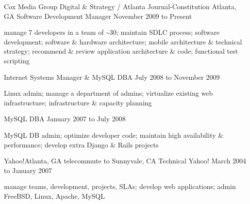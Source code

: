\documentclass[10pt]{article}
\begin{document}




\sectionheader
{Cox Media Group Digital \& Strategy / Atlanta Journal-Constitution}
{Atlanta, GA}
{Software Development Manager}
{November 2009 to Present}
\begin{longtext}
manage 7 developers in a team of \~{}30;
maintain SDLC process;
software development;
software \& hardware architecture;
mobile architecture \& technical strategy;
recommend \& review application architecture \& code;
functional test scripting

\end{longtext}
\sectionsub
{Internet Systems Manager \& MySQL DBA}
{July 2008 to November 2009}
\begin{longtext}
Linux admin;
manage a department of admins;
virtualize existing web infrastructure;
infrastructure \& capacity planning
\end{longtext}
\sectionsub
{MySQL DBA}
{January 2007 to July 2008}
\begin{longtext}
MySQL DB admin;
optimize developer code;
maintain high availability \& performance;
develop extra Django \& Rails projects
\end{longtext}

\sectionheader
{Yahoo!}{Atlanta, GA telecommute to Sunnyvale, CA}
{Technical Yahoo!}
{March 2004 to January 2007}
\begin{longtext}
manage teams, development, projects, SLAs;
develop web applications;
admin FreeBSD, Linux, Apache, MySQL
\end{longtext}
\end{document}
